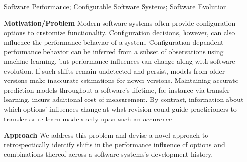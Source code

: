 \documentclass[utf8,biblatex]{lni}
\begin{document}
\begin{keywords}
Software Performance; Configurable Software Systems; Software Evolution
\end{keywords}

\textbf{\color{purple}Motivation/Problem} Modern software systems often provide configuration options to customize functionality. Configuration decisions, however, can also influence the performance behavior of a system. Configuration-dependent performance behavior can be inferred from a subset of observations using machine learning, but performance influences can change along with software evolution. If such shifts remain undetected and persist, models from older versions make inaccurate estimations for newer versions. Maintaining accurate prediction models throughout a software's lifetime, for instance via transfer learning, incurs additional cost of measurement. By contrast, information about which options' influences change at what revision could guide practicioners to transfer or re-learn models only upon such an occurence. 

\textbf{\color{purple}Approach}
We address this problem and devise a novel approach to retrospectically identify shifts in the performance influence of options and combinations thereof across a software systems's development history.
\cite{muhlbauer_accurate_2019,muehlbauer_identifying_2020}


\vfill
\printbibliography
\end{document}

